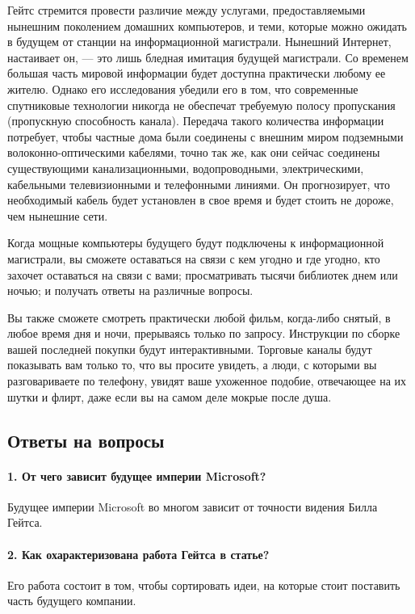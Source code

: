 \documentclass[a5paper, 12pt, twoside]{extreport}
\begin{document}
Гейтс стремится провести различие между услугами, предоставляемыми нынешним поколением домашних компьютеров, и теми, которые можно ожидать в будущем от станции на информационной магистрали. Нынешний Интернет, настаивает он, --- это лишь бледная имитация будущей магистрали. Со временем большая часть мировой информации будет доступна практически любому ее жителю. Однако его исследования убедили его в том, что современные спутниковые технологии никогда не обеспечат требуемую полосу пропускания (пропускную способность канала). Передача такого количества информации потребует, чтобы частные дома были соединены с внешним миром подземными волоконно-оптическими кабелями, точно так же, как они сейчас соединены существующими канализационными, водопроводными, электрическими, кабельными телевизионными и телефонными линиями. Он прогнозирует, что необходимый кабель будет установлен в свое время и будет стоить не дороже, чем нынешние сети.


Когда мощные компьютеры будущего будут подключены к информационной магистрали, вы сможете оставаться на связи с кем угодно и где угодно, кто захочет оставаться на связи с вами; просматривать тысячи библиотек днем или ночью; и получать ответы на различные вопросы.


Вы также сможете смотреть практически любой фильм, когда-либо снятый, в любое время дня и ночи, прерываясь только по запросу. Инструкции по сборке вашей последней покупки будут интерактивными. Торговые каналы будут показывать вам только то, что вы просите увидеть, а люди, с которыми вы разговариваете по телефону, увидят ваше ухоженное подобие, отвечающее на их шутки и флирт, даже если вы на самом деле мокрые после душа.

\subsection*{Ответы на вопросы}
    \paragraph{1. От чего зависит будущее империи Microsoft?}
    Будущее империи Microsoft во многом зависит от точности видения Билла Гейтса.
    
    \paragraph{2. Как охарактеризована работа Гейтса в статье?}
    Его работа состоит в том, чтобы сортировать идеи, на которые стоит поставить часть будущего компании. 
    
\end{document}

